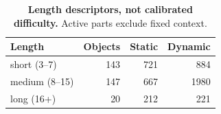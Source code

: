 \begin{table}[t]
\centering\small
\caption{\textbf{Length descriptors, not calibrated difficulty.} Active parts exclude fixed context.}
\label{tab:length}
\begin{tabularx}{\textwidth}{@{}Xrrr@{}}\toprule
Length & Objects & Static & Dynamic\\\midrule
short (3--7) & 143 & 721 & 884\\
medium (8--15) & 147 & 667 & 1980\\
long (16+) & 20 & 212 & 221\\
\bottomrule
\end{tabularx}
\end{table}
